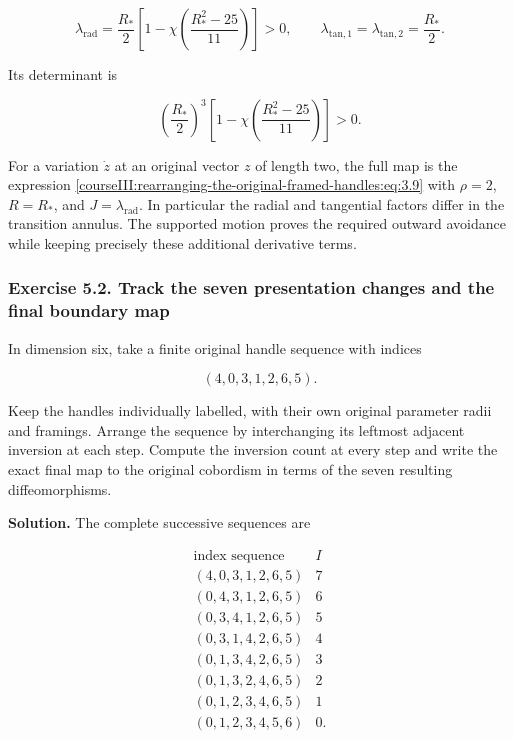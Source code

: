 \begin{equation}
\lambda_{\mathrm{rad}}
=\frac{R_*}{2}
 \left[1-\chi\left(\frac{R_*^2-25}{11}\right)\right]>0,
\qquad
\lambda_{\mathrm{tan},1}
=\lambda_{\mathrm{tan},2}
=\frac{R_*}{2}.
\label{courseIII:rearranging-the-original-framed-handles:eq:5.5}
\end{equation}

Its determinant is

\begin{equation}
\left(\frac{R_*}{2}\right)^3
\left[1-\chi\left(\frac{R_*^2-25}{11}\right)\right]>0.
\label{courseIII:rearranging-the-original-framed-handles:eq:5.6}
\end{equation}

For a variation \(\dot z\) at an original vector \(z\) of length two, the full map is the expression \eqref{courseIII:rearranging-the-original-framed-handles:eq:3.9} with \(\rho=2\), \(R=R_*\), and \(J=\lambda_{\mathrm{rad}}\). In particular the radial and tangential factors differ in the transition annulus. The supported motion proves the required outward avoidance while keeping precisely these additional derivative terms.

\subsubsection{Exercise 5.2. Track the seven presentation changes and the final boundary map}
\label{courseIII:rearranging-the-original-framed-handles:exercise-5.2}

\label{courseIII:handle-arrangement:5.2}

In dimension six, take a finite original handle sequence with indices

\begin{equation}
(4,0,3,1,2,6,5).
\label{courseIII:rearranging-the-original-framed-handles:eq:5.7}
\end{equation}

Keep the handles individually labelled, with their own original parameter radii and framings. Arrange the sequence by interchanging its leftmost adjacent inversion at each step. Compute the inversion count at every step and write the exact final map to the original cobordism in terms of the seven resulting diffeomorphisms.

\textbf{Solution.} The complete successive sequences are

\begin{equation}
\begin{array}{c|c}
\text{index sequence}&I\\ \hline
(4,0,3,1,2,6,5)&7\\
(0,4,3,1,2,6,5)&6\\
(0,3,4,1,2,6,5)&5\\
(0,3,1,4,2,6,5)&4\\
(0,1,3,4,2,6,5)&3\\
(0,1,3,2,4,6,5)&2\\
(0,1,2,3,4,6,5)&1\\
(0,1,2,3,4,5,6)&0 .
\end{array}
\label{courseIII:rearranging-the-original-framed-handles:eq:5.8}
\end{equation}

